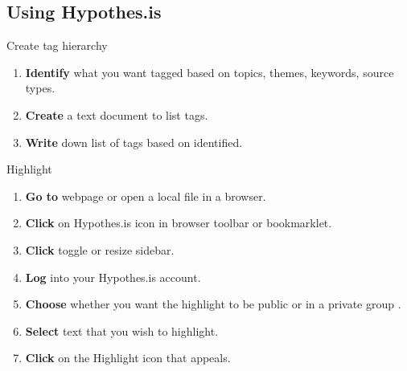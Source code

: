 \documentclass[10pt,a4paper]{article}
\begin{document}
\subsection{Using Hypothes.is}

\begin{textbox}{Create tag hierarchy}
 

  

\begin{enumerate}
\item \textbf{Identify} what you want tagged based on topics, themes, keywords, source types. 
\item \textbf{Create} a text document to list tags.
\item \textbf{Write} down list of tags based on identified.
\end{enumerate}

\end{textbox}


\begin{textbox}{Highlight}
 

  

\begin{enumerate}
\item \textbf{Go to} webpage or open a local file in a browser. 
\item \textbf{Click} on Hypothes.is icon in browser toolbar or bookmarklet.
\item \textbf{Click} toggle or resize sidebar.
\item \textbf{Log} into your Hypothes.is account.
\item \textbf{Choose} whether you want the highlight to be public or in a private group .
\item \textbf{Select} text that you wish to highlight.
\item \textbf{Click} on the Highlight icon that appeals.

\end{enumerate}

\end{textbox}
\end{document}
